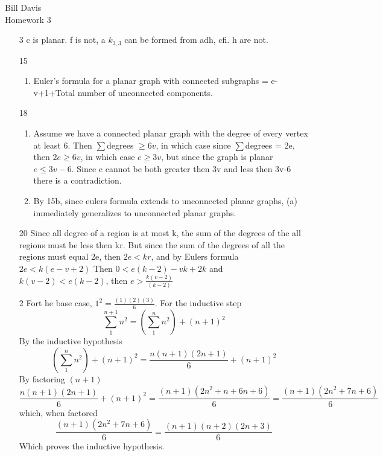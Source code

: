 \documentclass{article}
\begin{document}
Bill Davis\\
Homework 3

\begin{enumerate}
  
  \item[3]  c is planar. 
   f is not, a $k_{3,3}$ can be formed from adh, cfi. 
   h are not.  
  
  \item[15]
  \begin{enumerate}
      	\item
      		Euler's formula for a planar graph with connected subgraphs =
      		e-v+1+Total number of unconnected components. 
      	
      		
  \end{enumerate}
  \item[18]
  \begin{enumerate}
      \item 
      Assume we have a connected planar graph with the degree of every vertex
      at least 6. Then $\sum$degrees $\geq 6v$, in which case since
      $\sum$degrees = 2e, then $2e \geq 6v $, in which case $e \geq 3v $, but
      since the graph is planar $e \leq 3v-6$. Since e cannot be both greater
      then 3v and less then 3v-6 there is a contradiction. 
      \item
      By 15b, since eulers formula extends to unconnected planar graphs, (a)
      immediately generalizes to unconnected planar graphs. 
  \end{enumerate}
  \item[20]
  Since all degree of a region is at most k, the sum of the degrees of the all
  regions must be less then kr. But since the sum of the degrees of all the
  regions must equal 2e, then $2e<kr$, and by Eulers formula $2e<k(e-v+2)$
  Then $0<e(k-2)-vk+2k$ and $k(v-2) < e(k-2) $, then $e>\frac{k(v-2)}{(k-2)}$
  \item[2]
  Fort he base case, $1^2 = \frac{(1)(2)(3)}{6}$. For the inductive step
  \[
  \sum_{1}^{n+1} n^2 = (\sum_{1}^{n} n^2) + (n+1)^2
  \]
  By the inductive hypothesis 
  \[
  (\sum_{1}^{n} n^2) + (n+1)^2 = \frac{n(n+1)(2n+1)}{6} + (n+1)^2 
  \]
  By factoring $(n+1)$
  \[
  \frac{n(n+1)(2n+1)}{6} + (n+1)^2 = \frac{(n+1)(2n^2+n+6n+6)}{6} =
  \frac{(n+1)(2n^2+7n+6)}{6}
  \]
  which, when factored 
  \[
  \frac{(n+1)(2n^2+7n+6)}{6} = \frac{(n+1)(n+2)(2n+3)}{6}
  \]
  Which proves the inductive hypothesis. 
  

\end{enumerate}
\end{document}
